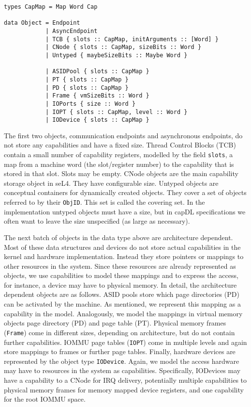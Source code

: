 \documentclass[a4paper,11pt]{article}
\begin{document}
\begin{verbatim}
types CapMap = Map Word Cap

data Object = Endpoint
            | AsyncEndpoint
            | TCB { slots :: CapMap, initArguments :: [Word] }
            | CNode { slots :: CapMap, sizeBits :: Word } 
            | Untyped { maybeSizeBits :: Maybe Word }

            | ASIDPool { slots :: CapMap }
            | PT { slots :: CapMap }
            | PD { slots :: CapMap }
            | Frame { vmSizeBits :: Word }
            | IOPorts { size :: Word }
            | IOPT { slots :: CapMap, level :: Word }
            | IODevice { slots :: CapMap }
\end{verbatim}

The first two objects, communication endpoints and asynchronous endpoints, do not store any capabilities and have a fixed size. Thread Control Blocks (TCB) contain a small number of capability registers, modelled by the field \texttt{slots}, a map from a machine word (the slot/register number) to the capability that is stored in that slot. Slots may be empty. CNode objects are the main capability storage object in seL4. They have configurable size. Untyped objects are conceptual containers for dynamically created objects. They cover a set of objects referred to by their \texttt{ObjID}. This set is called the covering set. In the implementation untyped objects must have a size, but in capDL specifications we often want to leave the size unspecified (as large as necessary). 

The next batch of objects in the data type above are architecture dependent. Most of these data structures and devices do not store actual capabilities in the kernel and hardware implementation. Instead they store pointers or mappings to other resources in the system. Since these resources are already represented as objects, we use capabilities to model these mappings and to express the access, for instance, a device may have to physical memory. In detail, the architecture dependent objects are as follows. ASID pools store which page directories (PD) can be activated by the machine. As mentioned, we represent this mapping as a capability in the model. Analogously, we model the mappings in virtual memory objects page directory (PD) and page table (PT). Physical memory frames (\texttt{Frame}) come in different sizes, depending on architecture, but do not contain further capabilities. IOMMU page tables (\texttt{IOPT}) come in multiple levels and again store mappings to frames or further page tables. Finally, hardware devices are represented by the object type \texttt{IODevice}. Again, we model the access hardware may have to resources in the system as capabilities. Specifically, IODevices may have a capability to a CNode for IRQ delivery, potentially multiple capabilities to physical memory frames for memory mapped device registers, and one capability for the root IOMMU space. 
\end{document}
